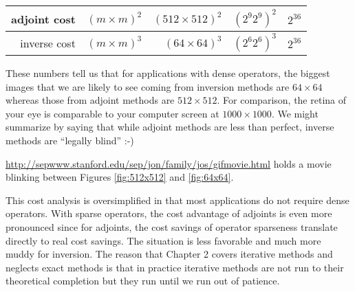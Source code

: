 \par
\begin{center}
\begin{tabular}{||r|r|r|r|r||}                                          \hline
adjoint cost &$(m\times m )^2$ & $(512\times 512)^2$ & $(2^9 2^9)^2$ & $2^{36}$
\\ \hline
inverse cost &$(m\times m )^3$ & $  (64\times 64)^3$ & $(2^6 2^6)^3$ & $2^{36}$
\\ \hline
\end{tabular}

\end{center}

\par\noindent
These numbers tell us that for applications with dense operators,
the biggest images that we are likely to see coming from inversion methods
are $64\times 64$ whereas those from adjoint methods are $512\times 512$.
For comparison, the retina of your eye is comparable to your computer
screen at $1000\times 1000$.
We might summarize by saying that while adjoint methods are less than perfect,
inverse methods are ``legally blind'' :-)
\par\noindent
\url{http://sepwww.stanford.edu/sep/jon/family/jos/gifmovie.html} holds a movie
blinking between Figures \ref{fig:512x512} and \ref{fig:64x64}.




\par
This cost analysis is oversimplified in that most applications
do not require dense operators.
With sparse operators, the cost advantage of adjoints is even more
pronounced since for adjoints,
the cost savings of operator sparseness translate directly to
real cost savings.
The situation is less favorable and much more muddy for inversion.
The reason that Chapter 2 covers iterative methods
and neglects exact methods is that in practice
iterative methods are not run to their theoretical completion
but they run until we run out of patience.

